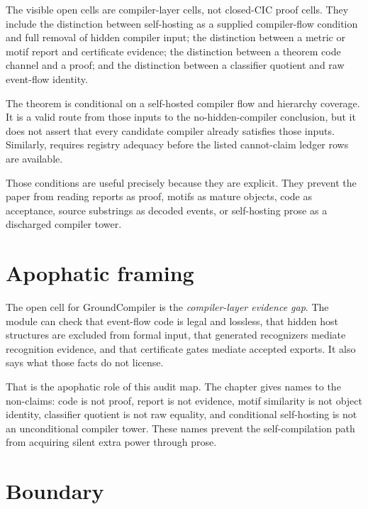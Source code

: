 The visible open cells are compiler-layer cells, not closed-CIC proof cells.
They include the distinction between self-hosting as a supplied compiler-flow
condition and full removal of hidden compiler input; the distinction between a
metric or motif report and certificate evidence; the distinction between a
theorem code channel and a proof; and the distinction between a classifier
quotient and raw event-flow identity.

The theorem
is conditional on a self-hosted compiler flow and hierarchy coverage. It is a
valid route from those inputs to the no-hidden-compiler conclusion, but it does
not assert that every candidate compiler already satisfies those inputs.
Similarly,
requires registry adequacy before the listed cannot-claim ledger rows are
available.

Those conditions are useful precisely because they are explicit. They prevent
the paper from reading reports as proof, motifs as mature objects, code as
acceptance, source substrings as decoded events, or self-hosting prose as a
discharged compiler tower.

\section{Apophatic framing}
\label{sec:bedc-groundcompiler-audit-map-apophatic-framing}

The open cell for GroundCompiler is the \emph{compiler-layer evidence gap}.
The module can check that event-flow code is legal and lossless, that hidden
host structures are excluded from formal input, that generated recognizers
mediate recognition evidence, and that certificate gates mediate accepted
exports. It also says what those facts do not license.

That is the apophatic role of this audit map. The chapter gives names to the
non-claims: code is not proof, report is not evidence, motif similarity is not
object identity, classifier quotient is not raw equality, and conditional
self-hosting is not an unconditional compiler tower. These names prevent the
self-compilation path from acquiring silent extra power through prose.

\section{Boundary}
\label{sec:bedc-groundcompiler-audit-map-boundary}

